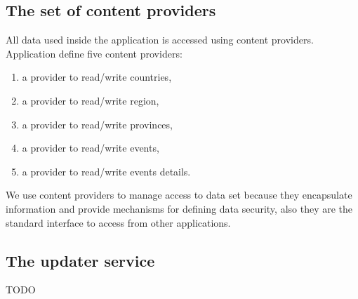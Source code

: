 \documentclass[12pt, twoside]{article}
\begin{document}
\subsection{The set of content providers}

All data used inside the application is accessed using content providers. Application define five content providers:
\begin{enumerate}
	\item a provider to read/write countries,
	\item a provider to read/write region,
	\item a provider to read/write provinces,
	\item a provider to read/write events,
	\item a provider to read/write events details.
\end{enumerate}

We use content providers to manage access to data set because they encapsulate information and provide mechanisms for defining data security, also they are the standard interface to access from other applications.

\subsection{The updater service}
TODO
\end{document}
